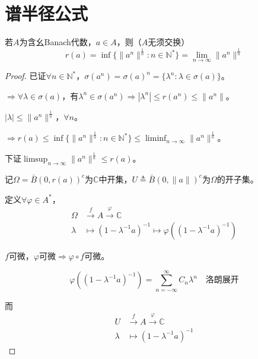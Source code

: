\documentclass[lang=cn,a4paper,newtx,section]{elegantbook}
\begin{document}
\section{谱半径公式}

\begin{theorem}
  若$A$为含幺Banach代数，$a \in A$，则（$A$无须交换）
  \begin{equation*}
    r(a) = \inf\{\|a^n\|^{\frac{1}{n}} : n \in \mathbb{N}^*\} = \lim_{n \to \infty}\|a^n\|^{\frac{1}{n}}
  \end{equation*}
\end{theorem}

\begin{proof}
  已证$\forall n \in \mathbb{N}^*$，$\sigma(a^n) = \sigma(a)^n = \{\lambda^n : \lambda \in \sigma(a)\}$。
  
  $\Rightarrow \forall \lambda \in \sigma(a)$，有$\lambda^n \in \sigma(a^n) \Rightarrow |\lambda^n| \leq r(a^n) \leq \|a^n\|$。
  
  $|\lambda| \leq \|a^n\|^{\frac{1}{n}}$，$\forall n$。
  
  $\Rightarrow r(a) \leq \inf\{\|a^n\|^{\frac{1}{n}} : n \in \mathbb{N}^*\} \leq \liminf_{n \to \infty}\|a^n\|^{\frac{1}{n}}$。
  
  下证$\limsup_{n \to \infty}\|a^n\|^{\frac{1}{n}} \leq r(a)$。
  
  记$\Omega = \bar{B}(0, r(a))^c$为$\mathbb{C}$中开集，$U \triangleq \bar{B}(0, \|a\|)^c$为$\Omega$的开子集。
  
  定义$\forall \varphi \in A^*$，
  \begin{equation*}
    \begin{aligned}
      \Omega &\xrightarrow{f} A \xrightarrow{\varphi} \mathbb{C} \\
      \lambda &\longmapsto (1 - \lambda^{-1}a)^{-1} \longmapsto \varphi((1 - \lambda^{-1}a)^{-1})
    \end{aligned}
  \end{equation*}
  
  $f$可微，$\varphi$可微$\Rightarrow \varphi \circ f$可微。
  
  \begin{equation*}
    \varphi((1 - \lambda^{-1}a)^{-1}) = \sum_{n=-\infty}^{\infty}C_n\lambda^n \quad \text{洛朗展开}
  \end{equation*}
  
  而
  \begin{equation*}
    \begin{aligned}
      U &\xrightarrow{f} A \xrightarrow{\varphi} \mathbb{C} \\
      \lambda &\longmapsto (1 - \lambda^{-1}a)^{-1}
    \end{aligned}
  \end{equation*}
  

\end{proof}
\end{document}
